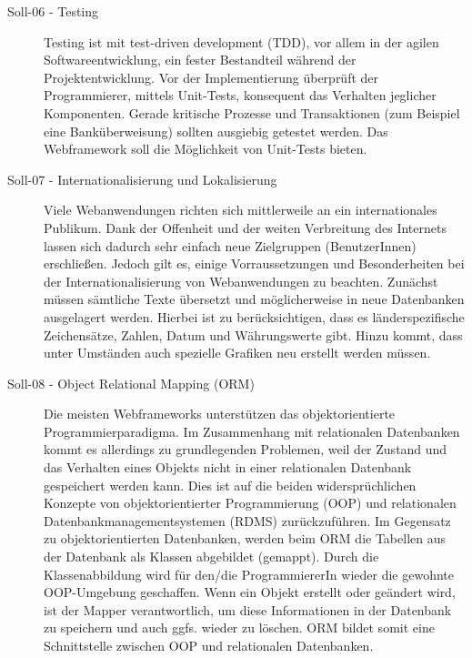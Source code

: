 \begin{description}
    \item[Soll-06 - Testing\label{itm:Soll-06}]

    Testing ist mit test-driven development (TDD), vor allem in der agilen
    Softwareentwicklung, ein fester Bestandteil während der Projektentwicklung.
    Vor der Implementierung überprüft der Programmierer, mittels Unit-Tests, 
    konsequent das Verhalten jeglicher Komponenten. Gerade kritische Prozesse
    und Transaktionen (zum Beispiel eine Banküberweisung) sollten ausgiebig
    getestet werden. Das Webframework soll die Möglichkeit von Unit-Tests
    bieten.

    \item[Soll-07 - Internationalisierung und Lokalisierung\label{itm:Soll-07}]

    Viele Webanwendungen richten sich mittlerweile an ein internationales
    Publikum. Dank der Offenheit und der weiten Verbreitung des Internets lassen
    sich dadurch sehr einfach neue Zielgruppen (BenutzerInnen) erschließen.
    Jedoch gilt es, einige Vorraussetzungen und Besonderheiten bei der
    Internationalisierung von Webanwendungen zu beachten. Zunächst müssen
    sämtliche Texte übersetzt und möglicherweise in neue Datenbanken ausgelagert
    werden. Hierbei ist zu berücksichtigen, dass es länderspezifische
    Zeichensätze, Zahlen, Datum und Währungswerte gibt. Hinzu kommt, dass unter
    Umständen auch spezielle Grafiken neu erstellt werden müssen.
    
    \item[Soll-08 - Object Relational Mapping (ORM)\label{itm:Soll-08}]
    Die meisten Webframeworks unterstützen das objektorientierte
    Programmierparadigma. Im Zusammenhang mit relationalen Datenbanken kommt es
    allerdings zu grundlegenden Problemen, weil der Zustand und das Verhalten
    eines Objekts nicht in einer relationalen Datenbank gespeichert werden
    kann. Dies ist auf die beiden widersprüchlichen Konzepte von
    objektorientierter Programmierung (OOP) und relationalen
    Datenbankmanagementsystemen (RDMS) zurückzuführen. Im Gegensatz zu
    objektorientierten Datenbanken, werden beim ORM die Tabellen aus der
    Datenbank als Klassen abgebildet (gemappt). Durch die Klassenabbildung wird
    für den/die ProgrammiererIn wieder die gewohnte OOP-Umgebung geschaffen.
    Wenn ein Objekt erstellt oder geändert wird, ist der Mapper verantwortlich,
    um diese Informationen in der Datenbank zu speichern und auch ggfs. wieder
    zu löschen. ORM bildet somit eine Schnittstelle zwischen OOP und
    relationalen Datenbanken.


\end{description}
